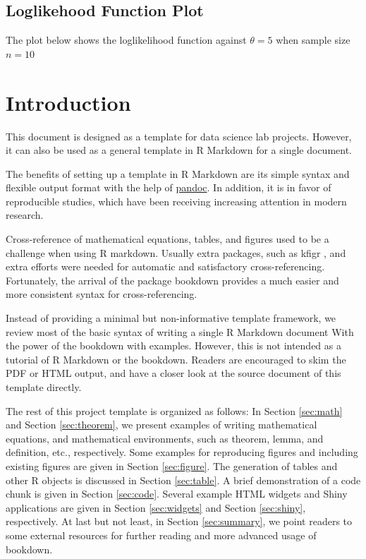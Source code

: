 \documentclass[11pt,letterpaper,]{article}
\newcommand{\pkg}[1]{{\normalfont\fontseries{b}\selectfont #1}}
\let\proglang=\textsf
\theoremstyle{definition}
\theoremstyle{definition}
\theoremstyle{definition}
\theoremstyle{remark}
\begin{document}
\hypertarget{loglikehood-function-plot}{%
\subsection{Loglikehood Function Plot}\label{loglikehood-function-plot}}

The plot below shows the loglikelihood function against \(\theta=5\)
when sample size \(n=10\)

\hypertarget{sec:intro}{%
\section{Introduction}\label{sec:intro}}

This document is designed as a template for data science lab projects.
However, it can also be used as a general template in
\proglang{R Markdown} for a single document.

The benefits of setting up a template in \proglang{R Markdown} are its
simple syntax and flexible output format with the help of
\href{http://pandoc.org/}{\pkg{pandoc}}. In addition, it is in favor of
reproducible studies, which have been receiving increasing attention in
modern research.

Cross-reference of mathematical equations, tables, and figures used to
be a challenge when using \proglang{R markdown}. Usually extra packages,
such as \pkg{kfigr} \citep{koohafkan2015kfigr}, and extra efforts were
needed for automatic and satisfactory cross-referencing. Fortunately,
the arrival of the package \pkg{bookdown} \citep{xie2017bookdown}
provides a much easier and more consistent syntax for cross-referencing.

Instead of providing a minimal but non-informative template framework,
we review most of the basic syntax of writing a single
\proglang{R Markdown} document With the power of the \pkg{bookdown} with
examples. However, this is not intended as a tutorial of
\proglang{R Markdown} or the \pkg{bookdown}. Readers are encouraged to
skim the PDF or HTML output, and have a closer look at the source
document of this template directly.

The rest of this project template is organized as follows: In Section
\ref{sec:math} and Section \ref{sec:theorem}, we present examples of
writing mathematical equations, and mathematical environments, such as
theorem, lemma, and definition, etc., respectively. Some examples for
reproducing figures and including existing figures are given in Section
\ref{sec:figure}. The generation of tables and other \proglang{R}
objects is discussed in Section \ref{sec:table}. A brief demonstration
of a code chunk is given in Section \ref{sec:code}. Several example HTML
widgets and Shiny applications are given in Section \ref{sec:widgets}
and Section \ref{sec:shiny}, respectively. At last but not least, in
Section \ref{sec:summary}, we point readers to some external resources
for further reading and more advanced usage of \pkg{bookdown}.
\end{document}
